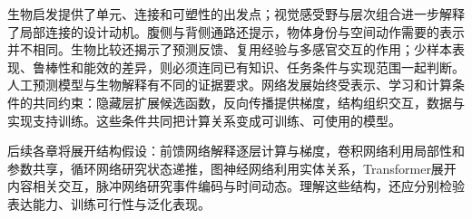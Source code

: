 生物启发提供了单元、连接和可塑性的出发点；视觉感受野与层次组合进一步解释了局部连接的设计动机。腹侧与背侧通路还提示，物体身份与空间动作需要的表示并不相同。生物比较还揭示了预测反馈、复用经验与多感官交互的作用；少样本表现、鲁棒性和能效的差异，则必须连同已有知识、任务条件与实现范围一起判断。人工预测模型与生物解释有不同的证据要求。网络发展始终受表示、学习和计算条件的共同约束：隐藏层扩展候选函数，反向传播提供梯度，结构组织交互，数据与实现支持训练。这些条件共同把计算关系变成可训练、可使用的模型。

后续各章将展开结构假设：前馈网络解释逐层计算与梯度，卷积网络利用局部性和参数共享，循环网络研究状态递推，图神经网络利用实体关系，Transformer展开内容相关交互，脉冲网络研究事件编码与时间动态。理解这些结构，还应分别检验表达能力、训练可行性与泛化表现。
